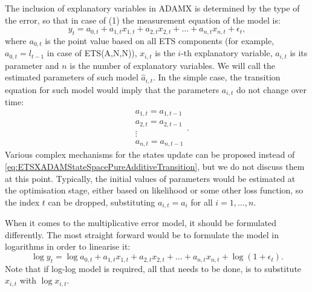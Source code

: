\documentclass[
]{book}
\theoremstyle{definition}
\theoremstyle{definition}
\theoremstyle{definition}
\theoremstyle{definition}
\theoremstyle{remark}
\begin{document}
The inclusion of explanatory variables in ADAMX is determined by the type of the error, so that in case of (1) the measurement equation of the model is:
\begin{equation}
  {y}_{t} = a_{0,t} + a_{1,t} x_{1,t} + a_{2,t} x_{2,t} + \dots + a_{n,t} x_{n,t} + \epsilon_t ,
  \label{eq:ETSXADAMStateSpacePureAdditiveMeasurement}
\end{equation}
where \(a_{0,t}\) is the point value based on all ETS components (for example, \(a_{0,t}=l_{t-1}\) in case of ETS(A,N,N)), \(x_{i,t}\) is the \(i\)-th explanatory variable, \(a_{i,t}\) is its parameter and \(n\) is the number of explanatory variables. We will call the estimated parameters of such model \(\hat{a}_{i,t}\). In the simple case, the transition equation for such model would imply that the parameters \(a_{i,t}\) do not change over time:
\begin{equation}
  \begin{aligned}
    &a_{1,t} = a_{1,t-1} \\
    &a_{2,t} = a_{2,t-1} \\
    &\vdots \\
    &a_{n,t} = a_{n,t-1}
  \end{aligned} .
  \label{eq:ETSXADAMStateSpacePureAdditiveTransition}
\end{equation}
Various complex mechanisms for the states update can be proposed instead of \eqref{eq:ETSXADAMStateSpacePureAdditiveTransition}, but we do not discuss them at this point. Typically, the initial values of parameters would be estimated at the optimisation stage, either based on likelihood or some other loss function, so the index \(t\) can be dropped, substituting \(a_{i,t}=a_{i}\) for all \(i=1,\dots,n\).

When it comes to the multiplicative error model, it should be formulated differently. The most straight forward would be to formulate the model in logarithms in order to linearise it:
\begin{equation}
  \log {y}_{t} = \log a_{0,t} + a_{1,t} x_{1,t} + a_{2,t} x_{2,t} + \dots + a_{n,t} x_{n,t} + \log(1+ \epsilon_t).
  \label{eq:ETSXADAMStateSpacePureMultiplicativeMeasurement}
\end{equation}
Note that if log-log model is required, all that needs to be done, is to substitute \(x_{i,t}\) with \(\log x_{i,t}\).
\end{document}
